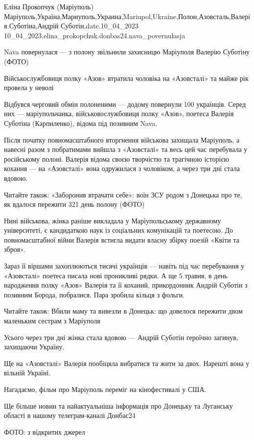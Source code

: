  
 
 
 
 

Еліна Прокопчук (Маріуполь)
Маріуполь,Україна,Мариуполь,Украина,Mariupol,Ukraine,Полон,Азовсталь,Валерія Суботіна,Андрій Суботін,date.10_04_2023
10_04_2023.elina_prokopchuk.donbas24.nava_povernulasja

Nava повернулася — з полону звільнили захисницю Маріуполя Валерію Суботіну
(ФОТО)

Військослужбовиця полку «Азов» втратила чоловіка на «Азовсталі» та майже рік
провела у неволі

Відбувся черговий обмін полоненими — додому повернули 100 українців. Серед них
— маріупольчанка, військовослужбовиця полку «Азов», поетеса Валерія Суботіна
(Карпиленко), відома під позивним Nava.

Після початку повномасштабного вторгнення військова захищала Маріуполь, а
навесні разом з побратимами вийшла з «Азовсталі» та весь цей час перебувала у
російському полоні. Валерія відома своєю творчістю та трагічною історією
кохання — на «Азовсталі» вона одружилася з чоловіком, а через три дні стала
вдовою.

Читайте також: «Заборонив втрачати себе»: воїн ЗСУ родом з Донецька про те, як
вдалося пережити 321 день полону (ФОТО)

Нині військова, жінка раніше викладала у Маріупольському державному
університеті, є кандидаткою наук із соціальних комунікацій та поетесою. До
повномасштабної війни Валерія встигла видати власну збірку поезій «Квіти та
зброя».

Зараз її віршами захоплюються тисячі українців — навіть під час перебування у
«Азовсталі» поетеса писала нові проникливі рядки. А ще 5 травня, в день
народження полку «Азов» Валерія та її коханий, прикордонник Андрій Суботін з
позивним Борода, побралися. Пара зробила кільця з фольги.

Читайте також: Вбили маму та вивезли в Донецьк: що довелося пережити двом
маленьким сестрам з Маріуполя

Усього через три дні жінка стала вдовою — Андрій Суботін героїчно загинув,
захищаючи Україну.

Ще на «Азовсталі» Валерія пообіцяла вибратися та жити за двох. Нарешті вона у
вільній Україні.

Нагадаємо, фільм про Маріуполь переміг на кінофестивалі у США.

Ще більше новин та найактуальніша інформація про Донецьку та Луганську області
в нашому телеграм-каналі Донбас24

ФОТО: з відкритих джерел
